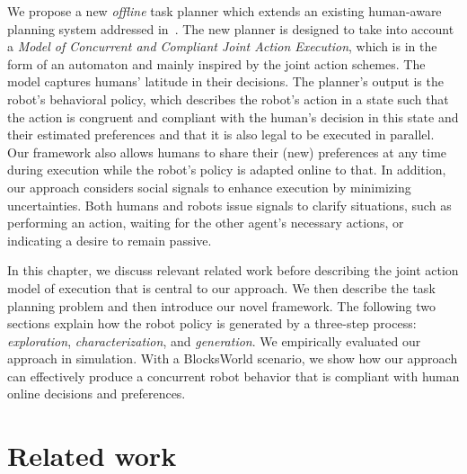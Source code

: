 We propose a new \textit{offline} task planner which extends an existing human-aware planning system addressed in~\cite{buisan_hatpehda_icra}. 
The new planner is designed to take into account a \textit{Model of Concurrent and Compliant Joint Action Execution}, which is in the form of an automaton and mainly inspired by the joint action schemes. 
The model captures humans' latitude in their decisions. 
The planner's output is the robot's behavioral policy, which describes the robot's action in a state such that the action is congruent and compliant with the human's decision in this state and their estimated preferences and that it is also legal to be executed in parallel. 
Our framework also allows humans to share their (new) preferences at any time during execution while the robot's policy is adapted online to that. 
In addition, our approach considers social signals to enhance execution by minimizing uncertainties. Both humans and robots issue signals to clarify situations, such as performing an action, waiting for the other agent's necessary actions, or indicating a desire to remain passive.

In this chapter, we discuss relevant related work before describing the joint action model of execution that is central to our approach. 
We then describe the task planning problem and then introduce our novel framework. 
The following two sections explain how the robot policy is generated by a three-step process: \textit{exploration}, \textit{characterization}, and \textit{generation}. 
We empirically evaluated our approach in simulation. With a BlocksWorld scenario, we show how our approach can effectively produce a concurrent robot behavior that is compliant with human online decisions and preferences.  

\section{Related work}

